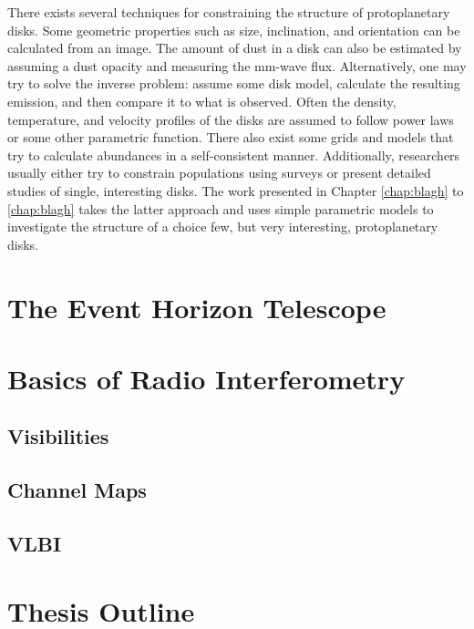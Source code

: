 There exists several techniques for constraining the structure of protoplanetary disks.  Some geometric 
properties such as size, inclination, and orientation can be calculated from an image.  The amount of dust 
in a disk can also be estimated by assuming a dust opacity and measuring the mm-wave flux.  Alternatively, one 
may try to solve the inverse problem: assume some disk model, calculate the resulting emission, and then compare
it to what is observed.  Often the density, temperature, and velocity profiles of the disks are assumed to 
follow power laws or some other parametric function.  There also exist some grids and models that try to 
calculate abundances in a self-consistent manner.  Additionally, researchers usually either try to constrain 
populations using 
surveys \citep[i.e.][]{andrews11,harris14} or present detailed studies of single, interesting disks.  The work
presented in Chapter \ref{chap:blagh} to \ref{chap:blagh} takes the latter approach and uses simple parametric 
models to investigate the structure of a choice few, but very interesting, protoplanetary disks.

\section{The Event Horizon Telescope}

\section{Basics of Radio Interferometry}
\subsection{Visibilities}
\subsection{Channel Maps}
\subsection{VLBI}

\section{Thesis Outline}

